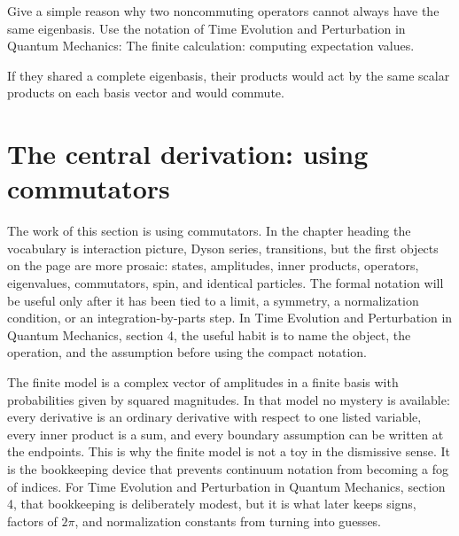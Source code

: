 \begin{exercise}
Give a simple reason why two noncommuting operators cannot always have the same eigenbasis.  Use the notation of Time Evolution and Perturbation in Quantum Mechanics: The finite calculation: computing expectation values.
\begin{answer}
If they shared a complete eigenbasis, their products would act by the same scalar products on each basis vector and would commute.
\end{answer}
\end{exercise}



\section{The central derivation: using commutators}













The work of this section is using commutators.  In the chapter heading the vocabulary is interaction picture, Dyson series, transitions, but the first objects on the page are more prosaic: states, amplitudes, inner products, operators, eigenvalues, commutators, spin, and identical particles.  The formal notation will be useful only after it has been tied to a limit, a symmetry, a normalization condition, or an integration-by-parts step.  In Time Evolution and Perturbation in Quantum Mechanics, section 4, the useful habit is to name the object, the operation, and the assumption before using the compact notation.

The finite model is a complex vector of amplitudes in a finite basis with probabilities given by squared magnitudes.  In that model no mystery is available: every derivative is an ordinary derivative with respect to one listed variable, every inner product is a sum, and every boundary assumption can be written at the endpoints.  This is why the finite model is not a toy in the dismissive sense.  It is the bookkeeping device that prevents continuum notation from becoming a fog of indices.  For Time Evolution and Perturbation in Quantum Mechanics, section 4, that bookkeeping is deliberately modest, but it is what later keeps signs, factors of \(2\pi\), and normalization constants from turning into guesses.

